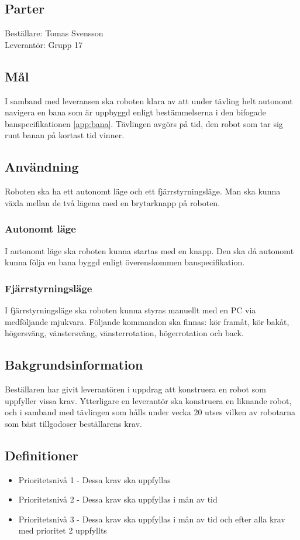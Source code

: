 \documentclass[a4paper,12pt]{article}
\begin{document}
\subsection{Parter}
Beställare: Tomas Svensson \\
Leverantör: Grupp 17


\subsection{Mål}
I samband med leveransen ska roboten klara av att under tävling helt autonomt navigera
en bana som är uppbyggd enligt bestämmelserna i den bifogade banspecifikationen \ref{app:bana}. 
 Tävlingen avgörs på tid, den robot som tar sig runt banan på kortast tid vinner.

\subsection{Användning}
Roboten ska ha ett autonomt läge och ett fjärrstyrningsläge.
Man ska kunna växla mellan de två lägena med en brytarknapp på roboten.

\subsubsection{Autonomt läge}
I autonomt läge ska roboten kunna startas med en knapp. Den ska då autonomt kunna följa en bana byggd enligt överenskommen banspecifikation.

\subsubsection{Fjärrstyrningsläge}
I fjärrstyrningsläge ska roboten kunna styras manuellt med en PC via medföljande mjukvara.
Följande kommandon ska finnas: kör framåt, kör bakåt, högersväng, vänstersväng, vänsterrotation, högerrotation och back. 

\subsection{Bakgrundsinformation}
Beställaren har givit leverantören i uppdrag att konstruera en robot som uppfyller vissa krav.
Ytterligare en leverantör ska konstruera en liknande robot,
och i samband med tävlingen som hålls under vecka 20 utses vilken av robotarna som bäst tillgodoser beställarens krav.

\subsection{Definitioner} \label{DEF}
\begin{itemize}
\item Prioritetsnivå 1 - Dessa krav ska uppfyllas
\item Prioritetsnivå 2 - Dessa krav ska uppfyllas i mån av tid
\item Prioritetsnivå 3 - Dessa krav ska uppfyllas i mån av tid och efter alla krav med prioritet 2 uppfyllts
\end{itemize}
\end{document}

